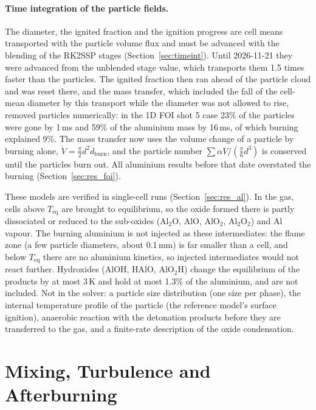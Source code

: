 \documentclass{article}
\begin{document}
\paragraph{Time integration of the particle fields.} The diameter, the ignited fraction and the ignition progress are cell means transported with the particle volume flux and must be advanced with the blending of the RK2SSP stages (Section~\ref{sec:timeint}). Until 2026-11-21 they were advanced from the unblended stage value, which transports them 1.5 times faster than the particles. The ignited fraction then ran ahead of the particle cloud and was reset there, and the mass transfer, which included the fall of the cell-mean diameter by this transport while the diameter was not allowed to rise, removed particles numerically: in the 1D FOI shot 5 case 23\% of the particles were gone by 1\,ms and 59\% of the aluminium mass by 16\,ms, of which burning explained 9\%. The mass transfer now uses the volume change of a particle by burning alone, $\dot V = \tfrac{\pi}{2}d^2\dot d_\text{burn}$, and the particle number $\sum\alpha V/(\tfrac{\pi}{6}d^3)$ is conserved until the particles burn out. All aluminium results before that date overstated the burning (Section~\ref{sec:res_foi}).

These models are verified in single-cell runs (Section~\ref{sec:res_al}). In the gas, cells above $T_\text{eq}$ are brought to equilibrium, so the oxide formed there is partly dissociated or reduced to the sub-oxides (Al$_2$O, AlO, AlO$_2$, Al$_2$O$_2$) and Al vapour. The burning aluminium is not injected as these intermediates: the flame zone (a few particle diameters, about 0.1\,mm) is far smaller than a cell, and below $T_\text{eq}$ there are no aluminium kinetics, so injected intermediates would not react further. Hydroxides (AlOH, HAlO, AlO$_2$H) change the equilibrium of the products by at most 3\,K and hold at most 1.3\% of the aluminium, and are not included. Not in the solver: a particle size distribution (one size per phase), the internal temperature profile of the particle (the reference model's surface ignition), anaerobic reaction with the detonation products before they are transferred to the gas, and a finite-rate description of the oxide condensation.

\section{Mixing, Turbulence and Afterburning}
\label{sec:mixing}
\end{document}
